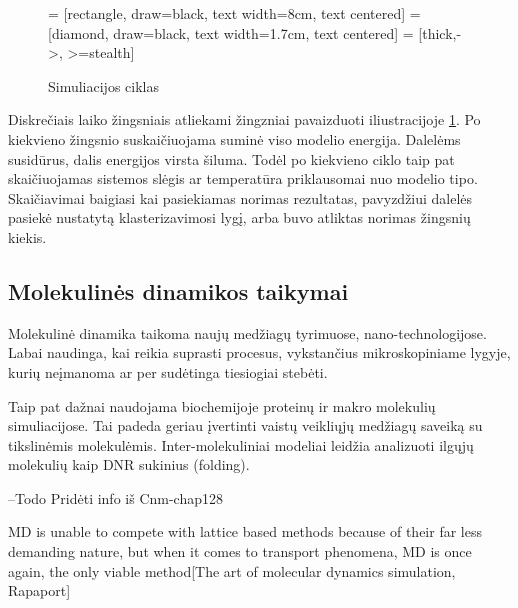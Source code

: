 \begin{figure}
\centering

\usetikzlibrary{shapes.geometric, arrows, arrows.meta, positioning, calc}
 = [rectangle, draw=black, text width=8cm, text centered]
 = [diamond, draw=black, text width=1.7cm, text centered]
 = [thick,->, >=stealth]


\caption[Simuliacijos ciklas] {Simuliacijos ciklas}
\label{fig:steps}
\end{figure}

Diskrečiais laiko žingsniais atliekami žingzniai pavaizduoti iliustracijoje \ref{fig:steps}.
Po kiekvieno žingsnio suskaičiuojama suminė viso modelio energija.
Dalelėms susidūrus, dalis energijos virsta šiluma.
Todėl po kiekvieno ciklo taip pat skaičiuojamas sistemos slėgis ar temperatūra priklausomai nuo modelio tipo.
Skaičiavimai baigiasi kai pasiekiamas norimas rezultatas, pavyzdžiui dalelės pasiekė nustatytą klasterizavimosi lygį,
arba buvo atliktas norimas žingsnių kiekis.


\subsection{Molekulinės dinamikos taikymai}
\label{sec:molecular_dynamics_applications}

Molekulinė dinamika taikoma naujų medžiagų tyrimuose, nano-technologijose.
Labai naudinga, kai reikia suprasti procesus, vykstančius mikroskopiniame lygyje, kurių neįmanoma ar per sudėtinga tiesiogiai stebėti.

Taip pat dažnai naudojama biochemijoje proteinų ir makro molekulių simuliacijose.
Tai padeda geriau įvertinti vaistų veikliųjų medžiagų saveiką su tikslinėmis molekulėmis.
Inter-molekuliniai modeliai leidžia analizuoti ilgųjų molekulių kaip DNR sukinius (folding).

--Todo
Pridėti info iš Cnm-chap128

MD is unable to compete with lattice based methods because of their far less demanding nature,
but when it comes to transport phenomena, MD is once again, the only viable method[The art of molecular dynamics simulation, Rapaport]

